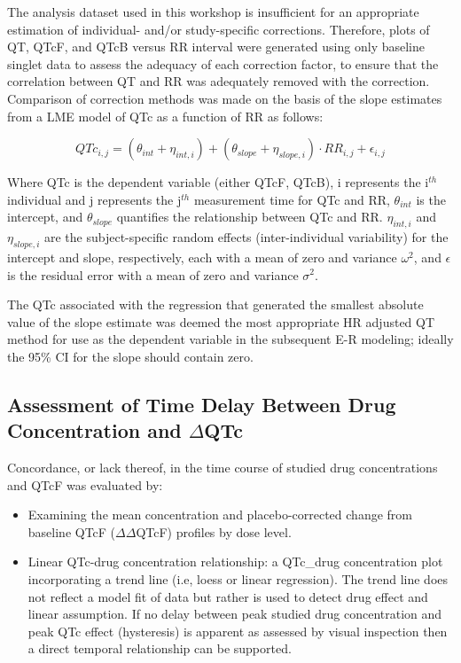 \documentclass[
]{article}
\providecommand{\tightlist}{%
  \setlength{\itemsep}{0pt}\setlength{\parskip}{0pt}}
\begin{document}
The analysis dataset used in this workshop is insufficient for an
appropriate estimation of individual- and/or study-specific corrections.
Therefore, plots of QT, QTcF, and QTcB versus RR interval were generated
using only baseline singlet data to assess the adequacy of each
correction factor, to ensure that the correlation between QT and RR was
adequately removed with the correction. Comparison of correction methods
was made on the basis of the slope estimates from a LME model of QTc as
a function of RR as follows:

\begin{equation} \label{QTlme}
QTc_{i,j} = (\theta_{int} + \eta_{int,i}) + (\theta_{slope} + \eta_{slope,i}) \cdot RR_{i,j} + \epsilon_{i,j}
\end{equation}

Where QTc is the dependent variable (either QTcF, QTcB), i represents
the i\(^{th}\) individual and j represents the j\(^{th}\) measurement
time for QTc and RR, \(\theta_{int}\) is the intercept, and
\(\theta_{slope}\) quantifies the relationship between QTc and RR.
\(\eta_{int,i}\) and \(\eta_{slope,i}\) are the subject-specific random
effects (inter-individual variability) for the intercept and slope,
respectively, each with a mean of zero and variance \(\omega^2\), and
\(\epsilon\) is the residual error with a mean of zero and variance
\(\sigma^2\).

The QTc associated with the regression that generated the smallest
absolute value of the slope estimate was deemed the most appropriate HR
adjusted QT method for use as the dependent variable in the subsequent
E-R modeling; ideally the 95\% CI for the slope should contain zero.

\hypertarget{assessment-of-time-delay-between-drug-concentration-and-deltaqtc}{%
\subsection{\texorpdfstring{Assessment of Time Delay Between Drug
Concentration and
\(\Delta\)QTc}{Assessment of Time Delay Between Drug Concentration and \textbackslash DeltaQTc}}\label{assessment-of-time-delay-between-drug-concentration-and-deltaqtc}}

Concordance, or lack thereof, in the time course of studied drug
concentrations and QTcF was evaluated by:

\begin{itemize}
\tightlist
\item
  Examining the mean concentration and placebo-corrected change from
  baseline QTcF (\(\Delta \Delta\)QTcF) profiles by dose level.
\item
  Linear QTc-drug concentration relationship: a QTc\_drug concentration
  plot incorporating a trend line (i.e, loess or linear regression). The
  trend line does not reflect a model fit of data but rather is used to
  detect drug effect and linear assumption. If no delay between peak
  studied drug concentration and peak QTc effect (hysteresis) is
  apparent as assessed by visual inspection then a direct temporal
  relationship can be supported.
\end{itemize}
\end{document}
